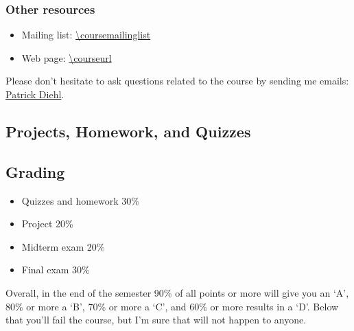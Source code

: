 \documentclass[11pt,letterpaper]{article}
\begin{document}
\subsubsection*{Other resources}

\begin{itemize}
\item Mailing list: \url{\coursemailinglist}
\item Web page: \url{\courseurl}
\end{itemize}

Please don’t hesitate to ask questions related to the course by sending me emails: \href{mailto:patrickdiehl@lsu.edu}{Patrick Diehl}. 

\subsection*{Projects, Homework, and Quizzes}

\subsection*{Grading}
\begin{itemize}
\item Quizzes and homework 30\%
\item Project 20\%
\item Midterm exam 20\%
\item Final exam 30\%
\end{itemize}
Overall, in the end of the semester 90\% of all points or more will give you an ‘A’, 80\% or more a ‘B’, 70\% or more a ‘C’, and 60\% or more results in a ‘D’. Below that you’ll fail the course, but I’m sure that will not happen to anyone.

\end{document}
